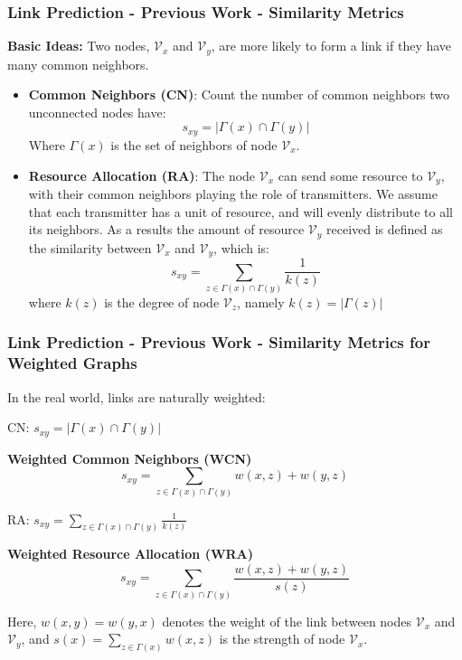 \documentclass[9pt]{beamer}
\begin{document}
\begin{frame}
\frametitle{Link Prediction - Previous Work - Similarity Metrics}
\textbf{Basic Ideas:} Two nodes, $\mathcal{V}_x$ and $\mathcal{V}_y$, are more likely to form a link if they have many common neighbors. 
\begin{itemize}
\item \textbf{Common Neighbors (CN)}: Count the number of common neighbors two unconnected nodes have:
\begin{equation}
s_{xy}=|\Gamma(x)\cap\Gamma(y)|
\end{equation}
Where $\Gamma(x)$ is the set of neighbors of node $\mathcal{V}_x$. 
\item \textbf{Resource Allocation (RA)}: The node $\mathcal{V}_x$ can send some resource to $\mathcal{V}_y$, with their common neighbors playing the role of transmitters. We assume that each transmitter has a unit of resource, and will evenly distribute to all its neighbors. As a results the amount of resource $\mathcal{V}_y$ received is defined as the similarity
between $\mathcal{V}_x$ and $\mathcal{V}_y$, which is:
\begin{equation}
s_{xy}=\sum_{z\in \Gamma(x)\cap\Gamma(y)}\frac{1}{k(z)}
\end{equation}
where $k(z)$ is the degree of node $\mathcal{V}_z$, namely $k(z) = |\Gamma(z)|$
\end{itemize}
\end{frame}

\begin{frame}
\frametitle{Link Prediction - Previous Work - Similarity Metrics for Weighted Graphs}

In the real world, links are naturally weighted:

CN: $s_{xy}=|\Gamma(x)\cap\Gamma(y)|$

\textbf{Weighted Common Neighbors (WCN)}
\begin{equation}
s_{xy}=\sum_{z\in \Gamma(x)\cap\Gamma(y)}w(x,z)+w(y,z)
\end{equation}

RA: $s_{xy}=\sum_{z\in \Gamma(x)\cap\Gamma(y)}\frac{1}{k(z)}$

\textbf{Weighted Resource Allocation (WRA)}
\begin{equation}
s_{xy}=\sum_{z\in \Gamma(x)\cap\Gamma(y)}\frac{w(x,z)+w(y,z)}{s(z)}
\end{equation}

Here, $w(x, y) = w(y, x)$ denotes the weight of the link between nodes $\mathcal{V}_x$ and $\mathcal{V}_y$, and $s(x)=\sum_{z\in\Gamma(x)}w(x,z)$ is the strength of node $\mathcal{V}_x$.
\end{frame}
\end{document}
